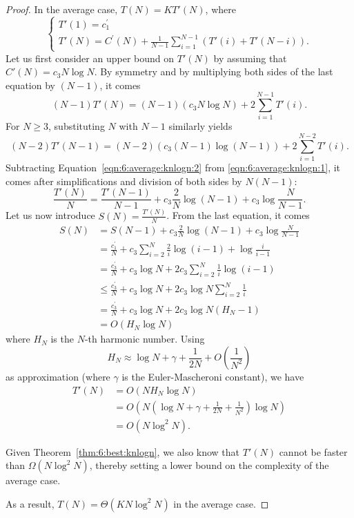 \begin{proof}
In the average case, $T(N) = K T'(N)$, where
\begin{equation}
\begin{cases}
T'(1) = c_1^\prime \\
T'(N) = C^\prime(N) +  \frac{1}{N-1} \sum_{i=1}^{N-1} ( T'(i) + T'(N-i) ).
\end{cases}
\end{equation}
Let us first consider an upper bound on $T'(N)$ by assuming that $C'(N) = c_3 N\log N$.
By symmetry and by multiplying both sides of the last equation by $(N-1)$, it comes
\begin{equation}\label{eqn:6:average:knlogn:1}
(N-1) T'(N) = (N-1)(c_3 N\log N) +  2 \sum_{i=1}^{N-1} T'(i).
\end{equation}
For $N \geq 3$, substituting $N$ with $N-1$ similarly yields
\begin{equation}\label{eqn:6:average:knlogn:2}
(N-2) T'(N-1) = (N-2)(c_3 (N-1) \log(N-1)) +  2 \sum_{i=1}^{N-2} T'(i).
\end{equation}
Subtracting Equation~\ref{eqn:6:average:knlogn:2} from \ref{eqn:6:average:knlogn:1},
it comes after simplifications and division of both sides by $N(N-1)$:
\begin{equation}
\frac{T'(N)}{N} = \frac{T'(N-1)}{N-1} + c_3 \frac{2}{N} \log(N-1) + c_3 \log \frac{N}{N-1}.
\end{equation}
Let us now introduce $S(N) = \frac{T'(N)}{N}$. From the last equation, it comes
\begin{align}
S(N) &= S(N-1) + c_3 \frac{2}{N} \log(N-1) + c_3 \log \frac{N}{N-1} \nonumber \\
     &= \frac{c_1^\prime}{N} + c_3 \sum_{i=2}^N \frac{2}{i} \log(i-1) + \log \frac{i}{i-1}  \nonumber \\
     &= \frac{c_3^\prime}{N} + c_3 \log N + 2 c_3 \sum_{i=2}^N \frac{1}{i} \log(i-1)  \nonumber \\
     &\leq \frac{c_3^\prime}{N} + c_3 \log N + 2 c_3 \log N \sum_{i=2}^N \frac{1}{i}  \nonumber \\
     &= \frac{c_3^\prime}{N} + c_3 \log N + 2 c_3 \log N (H_N - 1)  \nonumber \\
     &= O(H_N \log N)
\end{align}
where $H_N$ is the $N$-th harmonic number. Using
\begin{equation}
H_N \approx \log N + \gamma + \frac{1}{2N} + O(\frac{1}{N^2})
\end{equation}
as approximation (where $\gamma$ is the Euler-Mascheroni constant), we have
\begin{align*}
T'(N) &= O(N H_N \log N) \nonumber \\
      &= O(N (\log N + \gamma + \frac{1}{2N} + \frac{1}{N^2}) \log N  ) \nonumber \\
      &= O(N \log^2 N).
\end{align*}

Given Theorem~\ref{thm:6:best:knlogn}, we also know that $T'(N)$ cannot be
faster than $\Omega(N \log^2 N)$, thereby setting a lower bound on the complexity
of the average case.

As a result, $T(N) = \Theta(KN\log^2 N)$ in the average case.
\end{proof}

